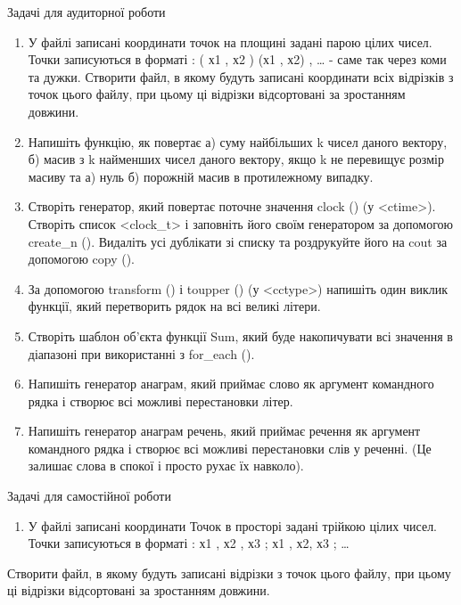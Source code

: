 \documentclass[]{article}
\makeatletter
\newcommand{\xslalph}[1]{\expandafter\@xslalph\csname c@#1\endcsname}
\newcommand{\@xslalph}[1]{%
    \ifcase#1\or а\or б\or в\or г\or д\or e\or є\or ж\or з\or i%
    \or й\or к\or л\or м\or н\or о\or п\or р\or с\or т%
    \or у\or ф\or х\or ц\or ч\or ш\or ю\or я\or аа\or бб\or вв%
    \else\@ctrerr\fi%
}
\makeatother
\begin{document}
\begin{enumerate}
\begin{enumerate}[label=\xslalph*)]
\begin{enumerate}
\begin{enumerate}[label=\xslalph*)]
Задачі для аудиторної роботи

\begin{enumerate}
\def\labelenumi{\arabic{enumi})}
\item
  У файлі записані координати точок на площині задані парою цілих чисел.
  Точки записуються в форматі : ( х1 , х2 ) (х1 , х2) , \ldots{} - саме
  так через коми та дужки. Створити файл, в якому будуть записані
  координати всіх відрізків з точок цього файлу, при цьому ці відрізки
  відсортовані за зростанням довжини.
\item
  Напишіть функцію, як повертає а) суму найбільших k чисел даного
  вектору, б) масив з k найменших чисел даного вектору, якщо k не
  перевищує розмір масиву та а) нуль б) порожній масив в протилежному
  випадку.
\item
  Створіть генератор, який повертає поточне значення clock () (у
  \textless{}ctime\textgreater{}). Створіть список
  \textless{}clock\_t\textgreater{} і заповніть його своїм генератором
  за допомогою create\_n (). Видаліть усі дублікати зі списку та
  роздрукуйте його на cout за допомогою copy ().
\item
  За допомогою transform () і toupper () (у
  \textless{}cctype\textgreater{}) напишіть один виклик функції, який
  перетворить рядок на всі великі літери.
\item
  Створіть шаблон об'єкта функції Sum, який буде накопичувати всі
  значення в діапазоні при використанні з for\_each ().
\item
  Напишіть генератор анаграм, який приймає слово як аргумент командного
  рядка і створює всі можливі перестановки літер.
\item
  Напишіть генератор анаграм речень, який приймає речення як аргумент
  командного рядка і створює всі можливі перестановки слів у реченні.
  (Це залишає слова в спокої і просто рухає їх навколо).
\end{enumerate}

Задачі для самостійної роботи

\begin{enumerate}
\def\labelenumi{\arabic{enumi})}
\item
  У файлі записані координати Точок в просторі задані трійкою цілих
  чисел. Точки записуються в форматі : х1 , х2 , х3 ; х1 , х2, х3 ;
  \ldots{}
\end{enumerate}

Створити файл, в якому будуть записані відрізки з точок цього файлу, при
цьому ці відрізки відсортовані за зростанням довжини.


\end{enumerate}
\end{enumerate}
\end{enumerate}
\end{enumerate}
\end{document}
